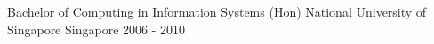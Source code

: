 

\begin{cventries}

  \cventry
    {Bachelor of Computing in Information Systems (Hon)} %
    {National University of Singapore} %
    {Singapore} %
    {2006 - 2010} %
    {
    }

\end{cventries}
